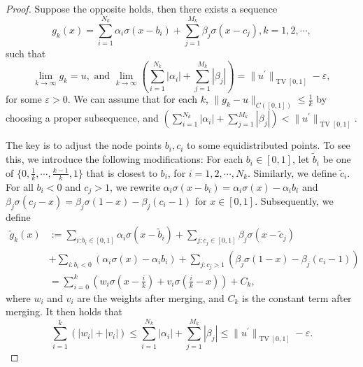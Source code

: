 \documentclass[12pt]{amsart}
\numberwithin{equation}{section}
\theoremstyle{remark}
\newcommand{\lt}[1]{\texttt{\color{blue} TL: \footnotesize #1}}
\begin{document}
\begin{proof}





Suppose the opposite holds, then there exists a sequence
\begin{equation}
    g_k(x) = \sum_{i=1}^{N_k} \alpha_i\sigma(x-b_i)+\sum_{j=1}^{M_k} \beta_j\sigma(x-c_j), k=1,2, \cdots,
\end{equation}
such that
\begin{equation}
    \lim_{k\to \infty} g_k=u, \text{ and } \lim_{k\to \infty} \left(\sum_{i=1}^{N_k}|\alpha_i|+\sum_{j=1}^{M_k}|\beta_j|\right) = \|{u^\prime}\|_{\operatorname{TV}[0,1]}-\varepsilon,
\end{equation}
for some $\varepsilon >0$. We can assume that for each $k$, $\|g_k-u\|_{C([0,1])}\le \frac 1 k$ by choosing a proper subsequence, and $\left(\sum_{i=1}^{N_k}|\alpha_i|+\sum_{j=1}^{M_k}|\beta_j|\right) < \|{u^\prime}\|_{\operatorname{TV}[0,1]}.$

The key is to adjust the node points $b_i, c_i$ to some equidistributed points. To see this, we introduce the following modifications: For each $b_i\in [0,1]$, let $\tilde b_i$ be one of $\{0, \frac 1 k, \cdots, \frac{k-1}{k}, 1\}$ that is closest to $b_i$, for $i = 1,2,\cdots, N_k$.
Similarly, we define $\tilde c_i$.
For all $b_i<0$ and $c_j>1$, we rewrite $\alpha_i\sigma(x-b_i) = \alpha_i\sigma(x) - \alpha_i b_i$ and $\beta_j\sigma(c_j-x) = \beta_j\sigma(1-x) - \beta_j (c_i-1)$ for $x\in [0,1]$.
Subsequently, we define
\begin{equation}
    \begin{aligned}
            \tilde g_k(x) & := \sum_{i:b_i\in [0,1]} \alpha_i\sigma(x-\tilde b_i)+\sum_{j:c_j\in [0,1]} \beta_j\sigma(x-\tilde c_j)\\ &+\sum_{i:b_i<0} (\alpha_i\sigma(x) - \alpha_i b_i)  +\sum_{j:c_j>1} (\beta_j\sigma(1-x) - \beta_j (c_i-1))\\
            &= \sum_{i=0}^{k} \left(w_i \sigma(x-\frac{i}{k})+ v_i\sigma(\frac i k-x)\right) +C_k,
    \end{aligned}
\end{equation}
where $w_i$ and $v_i$ are the weights after merging, and $C_k$ is the constant term after merging.
It then holds that
\begin{equation}
    \label{eq:weight_sum_upper_bound}
    \sum_{i=1}^k (|w_i|+|v_i|)\le \sum_{i=1}^{N_k}|\alpha_i|+\sum_{j=1}^{M_k}|\beta_j| \le \|{u^\prime}\|_{\operatorname{TV}[0,1]}-\varepsilon.
\end{equation}



\end{proof}
\end{document}
